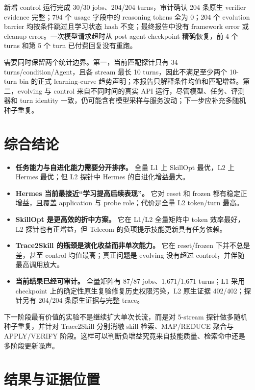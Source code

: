 \documentclass[11pt,a4paper]{article}
\begin{document}
新增 control 运行完成 30/30 jobs、204/204 turns，审计确认 204 条原生 verifier evidence 完整；794 个 usage 字段中的 reasoning tokens 全为 0；204 个 evolution barrier 均按条件跳过且学习状态 hash 不变；最终报告中没有 framework error 或 cleanup error。一次模型请求超时从 post-agent checkpoint 精确恢复，前 4 个 turns 和第 5 个 turn 已付费回复没有重跑。

需要同时保留两个统计边界。第一，当前匹配探针只有 34 turns/condition/Agent，且各 stream 最长 10 turns，因此不满足至少两个 10-turn bin 的正式 learning-curve 趋势声明；本报告只解释条件均值和匹配增益。第二，evolving 与 control 来自不同时间的真实 API 运行，尽管模型、任务、评测器和 turn identity 一致，仍可能含有模型采样与服务波动；下一步应补充多随机种子重复。

\section{综合结论}

\begin{itemize}
  \item \textbf{任务能力与自进化能力需要分开排序。} 全量 L1 上 SkillOpt 最优，L2 上 Hermes 最优；但 L2 探针中 Hermes 的自进化增益最大。
  \item \textbf{Hermes 当前最接近“学习提高后续表现”。} 它对 reset 和 frozen 都有稳定正增益，且覆盖 application 与 probe role；代价是全量 L2 token/turn 最高。
  \item \textbf{SkillOpt 是更高效的折中方案。} 它在 L1/L2 全量矩阵中 token 效率最好，L2 探针也有正增益，但 Telecom 的负项提示技能更新具有任务依赖。
  \item \textbf{Trace2Skill 的瓶颈是演化收益而非单次能力。} 它在 reset/frozen 下并不总是差，甚至 control 均值最高；真正问题是 evolving 没有超过 control，并伴随最高调用放大。
  \item \textbf{当前结果已经可审计。} 全量矩阵有 87/87 jobs、1,671/1,671 turns；L1 采用 checkpoint 上的确定性原生复验修复历史权限污染，L2 原生证据 402/402；探针另有 204/204 条原生证据与完整 trace。
\end{itemize}

下一阶段最有价值的实验不是继续扩大单次长流，而是对 5-stream 探针做多随机种子重复，并针对 Trace2Skill 分别消融 skill 检索、MAP/REDUCE 聚合与 APPLY/VERIFY 阶段。这样可以判断负增益究竟来自技能质量、检索命中还是多阶段更新噪声。

\section{结果与证据位置}
\end{document}
